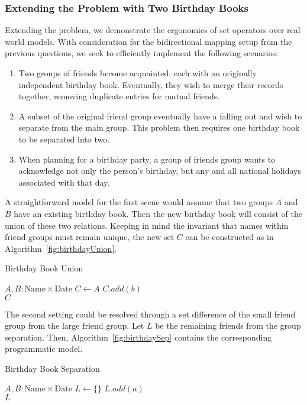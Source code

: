 \documentclass{article}
\begin{document}
\subsubsection{Extending the Problem with Two Birthday Books}
Extending the problem, we demonstrate the ergonomics of set operators over real world models. With consideration for the bidirectional mapping setup from the previous questions, we seek to efficiently implement the following scenarios:
\begin{enumerate}
  \item Two groups of friends become acquainted, each with an originally independent birthday book. Eventually, they wish to merge their records together, removing duplicate entries for mutual friends.
  \item A subset of the original friend group eventually have a falling out and wish to separate from the main group. This problem then requires one birthday book to be separated into two.
  \item When planning for a birthday party, a group of friends group wants to acknowledge not only the person's birthday, but any and all national holidays associated with that day.
\end{enumerate}

A straightforward model for the first scene would assume that two groups $A$ and $B$ have an existing birthday book. Then the new birthday book will consist of the union of these two relations. Keeping in mind the invariant that names within friend groups must remain unique, the new set $C$ can be constructed as in Algorithm~\ref{fig:birthdayUnion}.
\begin{algorithm}
  \caption{Birthday Book Union}
  \begin{algorithmic}
    \Require $A, B: \text{Name} \times \text{Date}$
    \State $C \gets A$
        \State $C.add(b)$
      \EndIf
    \EndFor\\
    \Return $C$
  \end{algorithmic}
  \label{fig:birthdayUnion}
\end{algorithm}

The second setting could be resolved through a set difference of the small friend group from the large friend group. Let $L$ be the remaining friends from the group separation. Then, Algorithm~\ref{fig:birthdaySep} contains the corresponding programmatic model.
\begin{algorithm}
  \caption{Birthday Book Separation}
  \begin{algorithmic}
    \Require $A, B: \text{Name} \times \text{Date}$
    \State $L \gets \{\}$
        \State $L.add(a)$
      \EndIf
    \EndFor\\
    \Return $L$
  \end{algorithmic}
  \label{fig:birthdaySep}
\end{algorithm}
\end{document}
